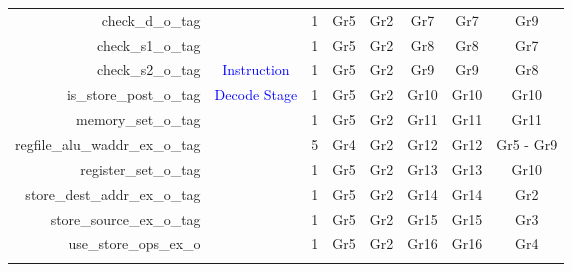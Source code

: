 \begin{table}[t]
\begin{tabular}{@{}rccccccc@{}}
        check\_d\_o\_tag                &                                       & 1      & Gr5                         & Gr2                         & Gr7                         & Gr7                         & Gr9                         \\
        check\_s1\_o\_tag               &                                       & 1      & Gr5                         & Gr2                         & Gr8                         & Gr8                         & Gr7                         \\
        check\_s2\_o\_tag               & \textcolor{blue}{Instruction}         & 1      & Gr5                         & Gr2                         & Gr9                         & Gr9                         & Gr8                         \\
        is\_store\_post\_o\_tag         & \textcolor{blue}{Decode Stage}        & 1      & Gr5                         & Gr2                         & Gr10                        & Gr10                        & Gr10                        \\
        memory\_set\_o\_tag             &                                       & 1      & Gr5                         & Gr2                         & Gr11                        & Gr11                        & Gr11                        \\
        regfile\_alu\_waddr\_ex\_o\_tag &                                       & 5      & Gr4                         & Gr2                         & Gr12                        & Gr12                        & Gr5 - Gr9                   \\
        register\_set\_o\_tag           &                                       & 1      & Gr5                         & Gr2                         & Gr13                        & Gr13                        & Gr10                        \\
        store\_dest\_addr\_ex\_o\_tag   &                                       & 1      & Gr5                         & Gr2                         & Gr14                        & Gr14                        & Gr2                         \\
        store\_source\_ex\_o\_tag       &                                       & 1      & Gr5                         & Gr2                         & Gr15                        & Gr15                        & Gr3                         \\
        use\_store\_ops\_ex\_o          &                                       & 1      & Gr5                         & Gr2                         & Gr16                        & Gr16                        & Gr4                         \\\hdashline

\end{tabular}
\end{table}
